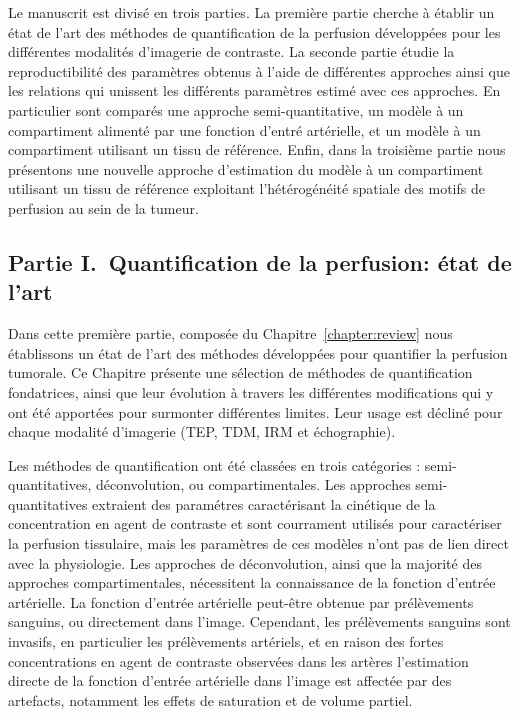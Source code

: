 \begin{otherlanguage}{francais}
Le manuscrit est divis\'e en trois parties.
La premi\`ere partie cherche \`a \'etablir un \'etat de l'art des m\'ethodes de quantification de la perfusion d\'evelopp\'ees pour les diff\'erentes modalit\'es d'imagerie de contraste.
La seconde partie \'etudie la reproductibilit\'e des param\`etres obtenus \`a l'aide de diff\'erentes approches ainsi que les relations qui unissent les diff\'erents param\`etres estim\'e avec ces approches.
En particulier sont compar\'es une approche semi-quantitative, un mod\`ele \`a un compartiment aliment\'e par une fonction d'entr\'e art\'erielle, et un mod\`ele \`a un compartiment utilisant un tissu de r\'ef\'erence.
Enfin, dans la troisi\`eme partie nous pr\'esentons une nouvelle approche d'estimation du mod\`ele \`a un compartiment utilisant un tissu de r\'ef\'erence exploitant l'h\'et\'erog\'en\'eit\'e spatiale des motifs de perfusion au sein de la tumeur.

\subsection*{Partie I.~Quantification de la perfusion: \'etat de l'art}
Dans cette premi\`ere partie, compos\'ee du Chapitre~\ref{chapter:review} nous \'etablissons un \'etat de l'art des m\'ethodes d\'evelopp\'ees pour quantifier la perfusion tumorale.
Ce Chapitre pr\'esente une s\'election de m\'ethodes de quantification fondatrices, ainsi que leur \'evolution \`a travers les diff\'erentes modifications qui y ont \'et\'e apport\'ees pour surmonter diff\'erentes limites.
Leur usage est d\'eclin\'e pour chaque modalit\'e d'imagerie (TEP, TDM, IRM et \'echographie).

Les m\'ethodes de quantification ont \'et\'e class\'ees en trois cat\'egories : semi-quantitatives, d\'econvolution, ou compartimentales.
Les approches semi-quantitatives extraient des param\'etres caract\'erisant la cin\'etique de la concentration en agent de contraste et sont courrament utilis\'es pour caract\'eriser la perfusion tissulaire, mais les param\`etres de ces mod\`eles n'ont pas de lien direct avec la physiologie.
Les approches de d\'econvolution, ainsi que la majorit\'e des approches compartimentales, n\'ecessitent la connaissance de la fonction d'entr\'ee art\'erielle.
La fonction d'entr\'ee art\'erielle peut-\^etre obtenue par pr\'el\`evements sanguins, ou directement dans l'image. 
Cependant, les pr\'el\`evements sanguins sont invasifs, en particulier les pr\'el\`evements art\'eriels, et en raison des fortes concentrations en agent de contraste observ\'ees dans les art\`eres l'estimation directe de la fonction d'entr\'ee art\'erielle dans l'image est affect\'ee par des artefacts, notamment les effets de saturation et de volume partiel.


\end{otherlanguage}
